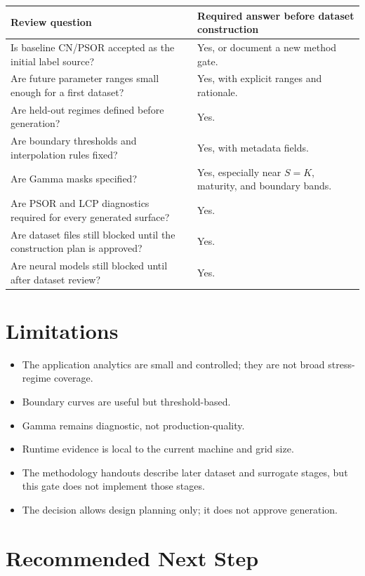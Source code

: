 \documentclass[11pt,a4paper]{article}
\begin{document}
\begin{longtable}{L{0.48\textwidth} L{0.33\textwidth}}
\toprule
Review question & Required answer before dataset construction \\
\midrule
\endhead
Is baseline CN/PSOR accepted as the initial label source? & Yes, or document a new method gate. \\
Are future parameter ranges small enough for a first dataset? & Yes, with explicit ranges and rationale. \\
Are held-out regimes defined before generation? & Yes. \\
Are boundary thresholds and interpolation rules fixed? & Yes, with metadata fields. \\
Are Gamma masks specified? & Yes, especially near \(S=K\), maturity, and boundary bands. \\
Are PSOR and LCP diagnostics required for every generated surface? & Yes. \\
Are dataset files still blocked until the construction plan is approved? & Yes. \\
Are neural models still blocked until after dataset review? & Yes. \\
\bottomrule
\end{longtable}

\section{Limitations}

\begin{itemize}
  \item The application analytics are small and controlled; they are not broad stress-regime
  coverage.
  \item Boundary curves are useful but threshold-based.
  \item Gamma remains diagnostic, not production-quality.
  \item Runtime evidence is local to the current machine and grid size.
  \item The methodology handouts describe later dataset and surrogate stages, but this gate does
  not implement those stages.
  \item The decision allows design planning only; it does not approve generation.
\end{itemize}

\section{Recommended Next Step}
\end{document}
